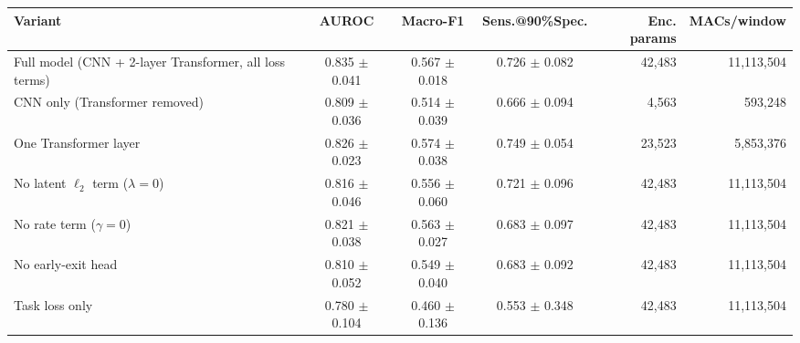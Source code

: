 \begin{tabular}{lcccrr}
\toprule
Variant & AUROC & Macro-F1 & Sens.@90\%Spec. & Enc. params & MACs/window \\
\midrule
Full model (CNN + 2-layer Transformer, all loss terms) & 0.835 $\pm$ 0.041 & 0.567 $\pm$ 0.018 & 0.726 $\pm$ 0.082 & 42,483 & 11,113,504 \\
CNN only (Transformer removed) & 0.809 $\pm$ 0.036 & 0.514 $\pm$ 0.039 & 0.666 $\pm$ 0.094 & 4,563 & 593,248 \\
One Transformer layer & 0.826 $\pm$ 0.023 & 0.574 $\pm$ 0.038 & 0.749 $\pm$ 0.054 & 23,523 & 5,853,376 \\
No latent $\ell_2$ term ($\lambda=0$) & 0.816 $\pm$ 0.046 & 0.556 $\pm$ 0.060 & 0.721 $\pm$ 0.096 & 42,483 & 11,113,504 \\
No rate term ($\gamma=0$) & 0.821 $\pm$ 0.038 & 0.563 $\pm$ 0.027 & 0.683 $\pm$ 0.097 & 42,483 & 11,113,504 \\
No early-exit head & 0.810 $\pm$ 0.052 & 0.549 $\pm$ 0.040 & 0.683 $\pm$ 0.092 & 42,483 & 11,113,504 \\
Task loss only & 0.780 $\pm$ 0.104 & 0.460 $\pm$ 0.136 & 0.553 $\pm$ 0.348 & 42,483 & 11,113,504 \\
\bottomrule
\end{tabular}
